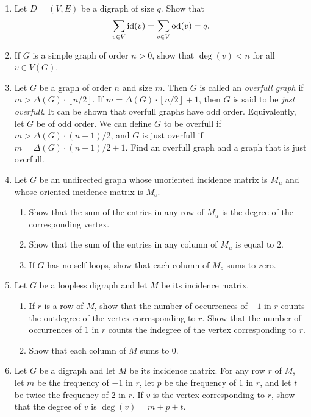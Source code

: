 \begin{enumerate}
\item Let $D = (V, E)$ be a digraph of size $q$. Show that
  \[
  \sum_{v \in V} \operatorname*{id}(v)
  =
  \sum_{v \in V} \operatorname*{od}(v)
  =
  q.
  \]

\item If $G$ is a simple graph of order $n > 0$, show that
  $\deg(v) < n$ for all $v \in V(G)$.

\item Let $G$ be a graph of order $n$ and size $m$. Then $G$ is called
  an \emph{overfull graph} if
  $m > \Delta(G) \cdot \left\lfloor n / 2 \right\rfloor$. If
  $m = \Delta(G) \cdot \left\lfloor n / 2 \right\rfloor + 1$, then $G$
  is said to be \emph{just overfull}. It can be shown that overfull
  graphs have odd order. Equivalently, let $G$ be of odd order. We can
  define $G$ to be overfull if $m > \Delta(G) \cdot (n-1)/2$,
  and $G$ is just overfull if $m = \Delta(G) \cdot (n-1)/2 + 1$. Find
  an overfull graph and a graph that is just overfull.

\item Let $G$ be an undirected graph whose unoriented incidence matrix
  is $M_u$ and whose oriented incidence matrix is $M_o$.
  \begin{enumerate}
  \item Show that the sum of the entries in any row of $M_u$ is the
    degree of the corresponding vertex.

  \item Show that the sum of the entries in any column of $M_u$ is
    equal to $2$.

  \item If $G$ has no self-loops, show that each column of $M_o$ sums
    to zero.
  \end{enumerate}

\item Let $G$ be a loopless digraph and let $M$ be its incidence
  matrix.
  \begin{enumerate}
  \item If $r$ is a row of $M$, show that the number of occurrences of
    $-1$ in $r$ counts the outdegree of the vertex corresponding to
    $r$. Show that the number of occurrences of $1$ in $r$ counts the
    indegree of the vertex corresponding to $r$.

  \item Show that each column of $M$ sums to $0$.
  \end{enumerate}

\item Let $G$ be a digraph and let $M$ be its incidence matrix. For
  any row $r$ of $M$, let $m$ be the frequency of $-1$ in $r$, let
  $p$ be the frequency of $1$ in $r$, and let $t$ be twice the
  frequency of $2$ in $r$. If $v$ is the vertex corresponding to
  $r$, show that the degree of $v$ is $\deg(v) = m + p + t$.


\end{enumerate}
